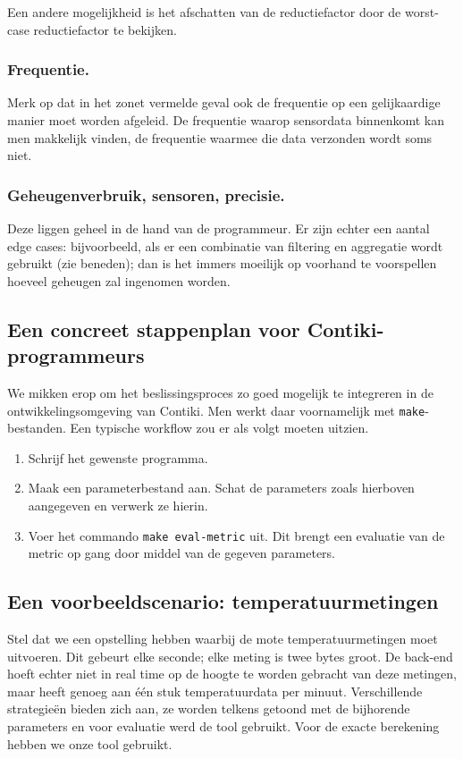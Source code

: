 \documentclass[11pt]{article}
\begin{document}
Een andere mogelijkheid is het afschatten van de reductiefactor door de
worst-case reductiefactor te bekijken.

\subsubsection{Frequentie.} Merk op dat in het zonet vermelde geval ook de
frequentie op een gelijkaardige manier moet worden afgeleid. De frequentie
waarop sensordata binnenkomt kan men makkelijk vinden, de frequentie waarmee die
data verzonden wordt soms niet. 

\subsubsection{Geheugenverbruik, sensoren, precisie.} Deze liggen geheel in de
hand van de programmeur. Er zijn echter een aantal edge cases: bijvoorbeeld, als
er een combinatie van filtering en aggregatie wordt gebruikt (zie beneden); dan
is het immers moeilijk op voorhand te voorspellen hoeveel geheugen zal ingenomen
worden.

\subsection{Een concreet stappenplan voor Contiki-programmeurs}
We mikken erop om het beslissingsproces zo goed mogelijk te integreren in
de ontwikkelingsomgeving van Contiki. Men werkt daar voornamelijk met
\texttt{make}-bestanden. Een typische workflow zou er als volgt moeten uitzien.

\begin{enumerate}
\item Schrijf het gewenste programma.
\item Maak een parameterbestand aan. Schat de parameters zoals hierboven
aangegeven en verwerk ze hierin.
\item Voer het commando \texttt{make eval-metric} uit. Dit brengt een evaluatie
van de metric op gang door middel van de gegeven parameters.
\end{enumerate}

\subsection{Een voorbeeldscenario: temperatuurmetingen}

Stel dat we een opstelling hebben waarbij de mote temperatuurmetingen moet
uitvoeren. Dit gebeurt elke seconde; elke meting is twee bytes groot. De
back-end hoeft echter niet in real time op de hoogte te worden gebracht van deze
metingen, maar heeft genoeg aan \'e\'en stuk temperatuurdata per
minuut. Verschillende strategie\"en bieden zich aan, ze worden telkens getoond
met de bijhorende parameters en voor evaluatie werd de tool gebruikt. Voor de
exacte berekening hebben we onze tool gebruikt.
\end{document}
